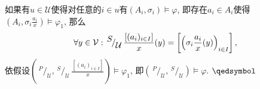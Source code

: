 \begin{enumerate}
    \vspace{3pt}\hspace{2.17em}
    如果有$u\in\mathcal{U}$使得对任意的$i\in u$有$(A_i,\sigma_i)\models\varphi$,
    即存在$a_i\in A_i$使得
    $\left(A_i,\sigma_i\displaystyle\frac{a_i}{x}\right)\models\varphi_1$, 那么
    \vspace{3pt}
    \[
        \forall y\in\mathcal{V}:\,^{\displaystyle S}
        \!/_{\displaystyle\mathcal{U}}\,\displaystyle\frac{[(a_i)_{i\in I}]}{x}(y)
        =\left[\left(\sigma_i\frac{a_i}{x}(y)\right)_{i\in I}\right],\\[3pt]
    \]
    依假设$\left(\,^{\displaystyle P}\!/_{\displaystyle\mathcal{U}},\,
    ^{\displaystyle S}\!/_{\displaystyle\mathcal{U}}\,
    \displaystyle\frac{[(a_i)_{i\in I}]}{x}\right)\models\varphi_1$,
    即$\left(\,^{\displaystyle P}\!/_{\displaystyle\mathcal{U}},\,
    ^{\displaystyle S}\!/_{\displaystyle\mathcal{U}}\right)\models\varphi$.
    \hfill $\qedsymbol$
\end{enumerate}

